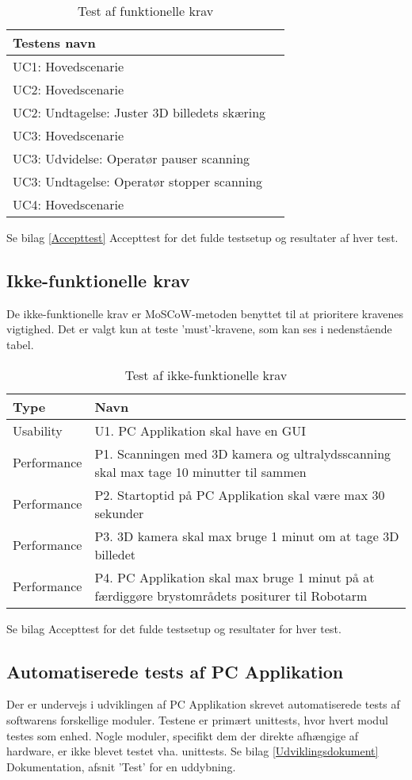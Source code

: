 \begin{table}[htb]
\centering
\begin{tabular}{ | l | p{} | } 
\hline
\textbf{Testens navn} \\\hline
UC1: Hovedscenarie\\\hline 
UC2: Hovedscenarie \\\hline 
UC2: Undtagelse: Juster 3D billedets skæring \\\hline 
UC3: Hovedscenarie \\\hline 
UC3: Udvidelse: Operatør pauser scanning \\\hline 
UC3: Undtagelse: Operatør stopper scanning \\\hline 
UC4: Hovedscenarie \\\hline 
\end{tabular}
\caption{Test af funktionelle krav} 
\end{table}

Se bilag \ref{Accepttest} Accepttest for det fulde testsetup og resultater af hver test. 

\subsection{Ikke-funktionelle krav} 
De ikke-funktionelle krav er MoSCoW-metoden benyttet til at prioritere kravenes vigtighed. Det er valgt kun at teste ’must’-kravene, som kan ses i nedenstående tabel. 

\begin{table}[htb]
\centering
\begin{tabular}{ | l | p{} | }
\hline
\textbf{Type} & \textbf{Navn} \\\hline
Usability & U1. PC Applikation skal have en GUI \\\hline 
Performance & P1. Scanningen med 3D kamera og ultralydsscanning skal max tage 10
minutter til sammen \\\hline 
Performance & P2. Startoptid på PC Applikation skal være max 30 sekunder \\\hline
Performance & P3. 3D kamera skal max bruge 1 minut om at tage 3D billedet \\\hline 
Performance & P4. PC Applikation skal max bruge 1 minut på at færdiggøre brystområdets
positurer til Robotarm \\\hline 
\end{tabular}
\caption{Test af ikke-funktionelle krav}
\end{table}

Se bilag Accepttest for det fulde testsetup og resultater for hver test. 

\subsection{Automatiserede tests af PC Applikation}
Der er undervejs i udviklingen af PC Applikation skrevet automatiserede tests af softwarens forskellige moduler. Testene er primært unittests, hvor hvert modul testes som enhed. Nogle moduler, specifikt dem der direkte afhængige af hardware, er ikke blevet testet vha. unittests. Se bilag \ref{Udviklingsdokument} Dokumentation, afsnit 'Test' for en uddybning.